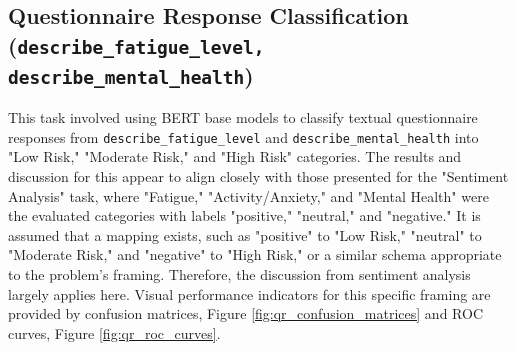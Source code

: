 \subsection{Questionnaire Response Classification (\texttt{describe\_fatigue\_level, describe\_mental\_health})}

This task involved using BERT base models to classify textual questionnaire responses from \texttt{describe\_fatigue\_level} and \texttt{describe\_mental\_health} into "Low Risk," "Moderate Risk," and "High Risk" categories. The results and discussion for this appear to align closely with those presented for the "Sentiment Analysis" task, where "Fatigue," "Activity/Anxiety," and "Mental Health" were the evaluated categories with labels "positive," "neutral," and "negative." It is assumed that a mapping exists, such as "positive" to "Low Risk," "neutral" to "Moderate Risk," and "negative" to "High Risk," or a similar schema appropriate to the problem's framing. Therefore, the discussion from sentiment analysis largely applies here. Visual performance indicators for this specific framing are provided by confusion matrices, Figure \ref{fig:qr_confusion_matrices} and ROC curves, Figure \ref{fig:qr_roc_curves}.

